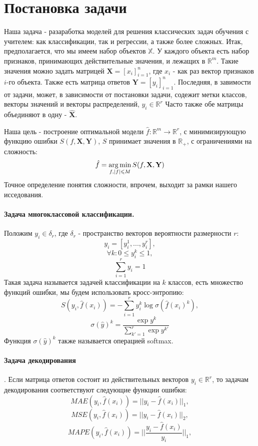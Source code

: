 \documentclass[12pt,twoside]{article}
\begin{document}
\section{Постановка задачи}

Наша задача  - разаработка моделей для решения классических задач обучения с учителем: как классификации, так и регрессии, а также более сложных. Итак, предполагается, что мы имеем набор объектов $\mathbb{X}$.  У каждого объекта есть набор признаков, принимающих действительные значения,  и лежащих в $\mathbb{R}^m$.  Такие значения можно задать матрицей 
$\mathbf{X} = [x_i]_{i = 1}^n$, где $x_i$ -  как раз вектор признаков $i$-го объекта. Также есть матрица ответов $\mathbf{Y} = [y_i]_{i = 1}^n$. Последняя, в завимости от задачи, может, в зависимости от постановки задачи, содежит метки классов, векторы значений и векторы распределений, $y_i \in \mathbb{R}^r$ Часто также обе матрицы объединяют в одну - $\hat{\mathbf{X}}$.

Наша цель - построение оптимальной модели $\hat{f}: \mathbb{R}^m \rightarrow \mathbb{R}^r$, с минимизирующую функцию ошибки $S(f,  \mathbf{X}, \mathbf{Y})$, $S$ принимает значения в $\mathbb{R}_+$, с ограничениями на сложность:
$$ \hat{f} = \argmin\limits_{f, |f| \leq M}{S(f, \mathbf{X}, \mathbf{Y})}$$ 
Точное определение понятия сложности, впрочем, выходит за рамки нашего исседования. 

\paragraph{Задача многоклассовой классификации.}
Положим $y_i \in \delta_r$, где $\delta_r$ - пространство векторов вероятности размерности $r$:
$$ y_i = [y_i^1, ..., y_i^r],$$
$$ \forall k: 0 \leq y_i^k  \leq 1,$$
$$ \sum\limits_{i = 1}^r y_i = 1$$	
Такая задача называется задачей классификации на $k$ классов, есть множество функций ошибки, мы будем использовать кросс-энтропию: 
$$S(y_i, \hat{f}(x_i)) =  - \sum\limits_{i=1}^r y_i^k \log \sigma(\hat{f}(x_i)^k), $$
$$\sigma (\hat{y})^k = \frac{\exp y^k}{\sum\limits_{k' = 1}^{r} \exp y^{k'}} $$
Функция $\sigma (\hat{y})^k $ также называется операцией softmax.

\paragraph{Задача декодирования}.
Если матрица ответов состоит из действительных векторов  $y_i \in \mathbb{R}^r$, то задачам декодирования соответствуют следующие функции ошибки:
$$MAE(y_i, \hat{f}(x_i)) = || y_i - \hat{f}(x_i) ||_1,$$
$$MSE(y_i, \hat{f}(x_i)) = || y_i - \hat{f}(x_i) ||_2,$$
$$MAPE(y_i, \hat{f}(x_i)) = ||\frac{ y_i - \hat{f}(x_i)}{y_i} ||_1,$$
\end{document}
